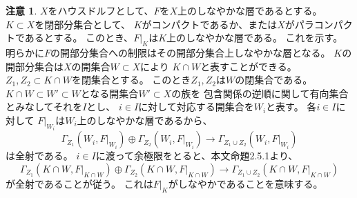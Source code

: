 \documentclass[uplatex,dvipdfmx]{jsarticle}
\theoremstyle{definition}
\newtheorem*{rem*}{注意}
\begin{document}
\begin{rem*}
  \(X\)をハウスドルフとして、\(F\)を\(X\)上のしなやかな層であるとする。
  \(K\subset X\)を閉部分集合として、
  \(K\)がコンパクトであるか、または\(X\)がパラコンパクトであるとする。
  このとき、\(F|_K\)は\(K\)上のしなやかな層である。
  これを示す。
  明らかに\(F\)の開部分集合への制限はその開部分集合上しなやかな層となる。
  \(K\)の開部分集合は\(X\)の開集合\(W\subset X\)により
  \(K\cap W\)と表すことができる。
  \(Z_1,Z_2\subset K\cap W\)を閉集合とする。
  このとき\(Z_1,Z_2\)は\(W\)の閉集合である。
  \(K\cap W\subset W' \subset W\)となる開集合\(W'\subset X\)の族を
  包含関係の逆順に関して有向集合とみなしてそれを\(I\)とし、
  \(i\in I\)に対して対応する開集合を\(W_i\)と表す。
  各\(i\in I\)に対して
  \(F|_{W_i}\)は\(W_i\)上のしなやかな層であるから、
  \[
  \Gamma_{Z_1}(W_i,F|_{W_i}) \oplus \Gamma_{Z_2}(W_i,F|_{W_i})
  \to \Gamma_{Z_1\cup Z_2}(W_i,F|_{W_i})
  \]
  は全射である。
  \(i\in I\)に渡って余極限をとると、本文命題2.5.1より、
  \[
  \Gamma_{Z_1}(K\cap W,F|_{K\cap W}) \oplus \Gamma_{Z_2}(K\cap W,F|_{K\cap W})
  \to \Gamma_{Z_1\cup Z_2}(K\cap W,F|_{K\cap W})
  \]
  が全射であることが従う。
  これは\(F|_K\)がしなやかであることを意味する。
\end{rem*}
\end{document}
